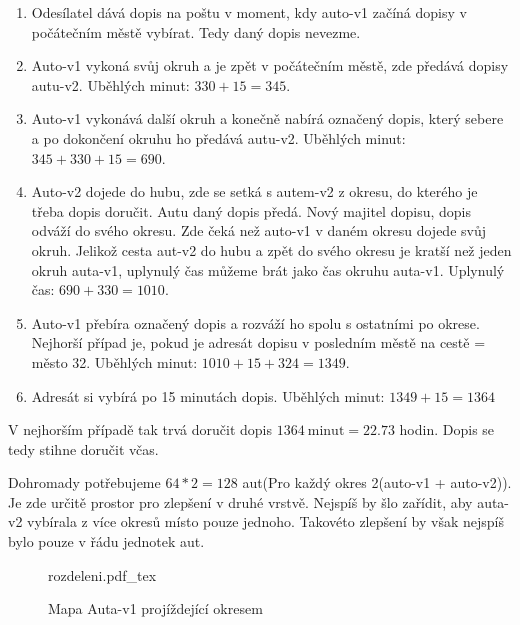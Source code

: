 \documentclass[a4paper]{article}
\newcommand{\incfig}[2][1]{%
    \def\svgwidth{#1\columnwidth}
    {#2.pdf_tex}
}
\begin{document}
\begin{enumerate}
    \item Odesílatel dává dopis na poštu v moment, kdy auto-v1 začíná dopisy v počátečním městě vybírat. Tedy daný dopis nevezme.
    \item Auto-v1 vykoná svůj okruh a je zpět v počátečním městě, zde předává dopisy autu-v2. Uběhlých minut: $330 + 15 = 345$.
    \item Auto-v1 vykonává další okruh a konečně nabírá označený dopis, který sebere a po dokončení okruhu ho předává autu-v2. Uběhlých minut: $345 + 330 + 15 = 690$.

    \item Auto-v2 dojede do hubu, zde se setká s autem-v2 z okresu, do kterého je třeba dopis doručit. Autu daný dopis předá. Nový majitel dopisu, dopis odváží do svého okresu. Zde čeká než auto-v1 v daném okresu dojede svůj okruh. Jelikož cesta aut-v2 do hubu a zpět do svého okresu je kratší než jeden okruh auta-v1, uplynulý čas můžeme brát jako čas okruhu auta-v1. Uplynulý čas: $690 + 330 = 1010$.
    \item Auto-v1 přebíra označený dopis a rozváží ho spolu s ostatními po okrese. Nejhorší případ je, pokud je adresát dopisu v posledním městě na cestě = město 32. Uběhlých minut: $1010 + 15 + 324 = 1349$.
    \item Adresát si vybírá po 15 minutách dopis. Uběhlých minut: $1349 + 15 = 1364$

\end{enumerate}
V nejhorším případě tak trvá doručit dopis $1364 \ \text{minut} = 22.73 $ hodin.
Dopis se tedy stihne doručit včas.

Dohromady potřebujeme $64*2 = 128$ aut(Pro každý okres 2(auto-v1 + auto-v2)).
Je zde určitě prostor pro zlepšení v druhé vrstvě. Nejspíš by šlo zařídit, aby auta-v2 vybírala z více okresů místo pouze jednoho. Takovéto zlepšení by však nejspíš bylo pouze v řádu jednotek aut.

\begin{figure}[ht]
    \centering
    \incfig{rozdeleni}
    \caption{Mapa Auta-v1 projíždející okresem}
    \label{fig:rozdeleni}
\end{figure}
    
\end{document}
